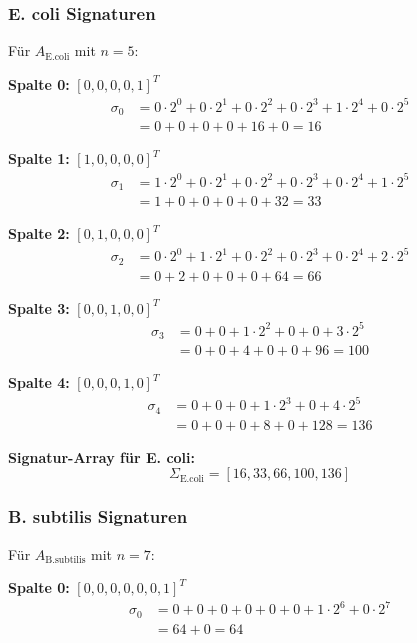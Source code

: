 \documentclass[a4paper,12pt]{article}
\theoremstyle{definition}
\begin{document}
\subsubsection*{E. coli Signaturen}

Für $A_{\text{E.coli}}$ mit $n = 5$:

\textbf{Spalte 0: } $[0, 0, 0, 0, 1]^T$
\begin{align*}
\sigma_0 &= 0 \cdot 2^0 + 0 \cdot 2^1 + 0 \cdot 2^2 + 0 \cdot 2^3 + 1 \cdot 2^4 + 0 \cdot 2^5 \\
&= 0 + 0 + 0 + 0 + 16 + 0 = \boxed{16}
\end{align*}

\textbf{Spalte 1: } $[1, 0, 0, 0, 0]^T$
\begin{align*}
\sigma_1 &= 1 \cdot 2^0 + 0 \cdot 2^1 + 0 \cdot 2^2 + 0 \cdot 2^3 + 0 \cdot 2^4 + 1 \cdot 2^5 \\
&= 1 + 0 + 0 + 0 + 0 + 32 = \boxed{33}
\end{align*}

\textbf{Spalte 2: } $[0, 1, 0, 0, 0]^T$
\begin{align*}
\sigma_2 &= 0 \cdot 2^0 + 1 \cdot 2^1 + 0 \cdot 2^2 + 0 \cdot 2^3 + 0 \cdot 2^4 + 2 \cdot 2^5 \\
&= 0 + 2 + 0 + 0 + 0 + 64 = \boxed{66}
\end{align*}

\textbf{Spalte 3: } $[0, 0, 1, 0, 0]^T$
\begin{align*}
\sigma_3 &= 0 + 0 + 1 \cdot 2^2 + 0 + 0 + 3 \cdot 2^5 \\
&= 0 + 0 + 4 + 0 + 0 + 96 = \boxed{100}
\end{align*}

\textbf{Spalte 4: } $[0, 0, 0, 1, 0]^T$
\begin{align*}
\sigma_4 &= 0 + 0 + 0 + 1 \cdot 2^3 + 0 + 4 \cdot 2^5 \\
&= 0 + 0 + 0 + 8 + 0 + 128 = \boxed{136}
\end{align*}

\textbf{Signatur-Array für E. coli:}
\[
\boxed{\Sigma_{\text{E.coli}} = [16, 33, 66, 100, 136]}
\]


\subsubsection*{B. subtilis Signaturen}

Für $A_{\text{B.subtilis}}$ mit $n = 7$:

\textbf{Spalte 0: } $[0, 0, 0, 0, 0, 0, 1]^T$
\begin{align*}
\sigma_0 &= 0 + 0 + 0 + 0 + 0 + 0 + 1 \cdot 2^6 + 0 \cdot 2^7 \\
&= 64 + 0 = \boxed{64}
\end{align*}
\end{document}

